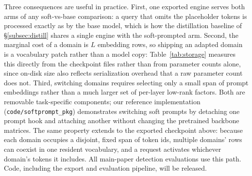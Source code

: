 \documentclass{article}
\begin{document}
Three consequences are useful in practice.
First, one exported engine serves both arms of any soft-vs-base comparison: a query that omits the placeholder tokens is processed exactly as by the base model, which is how the distillation baseline of \S\ref{subsec:distill} shares a single engine with the soft-prompted arm.
Second, the marginal cost of a domain is $L$ embedding rows, so shipping an adapted domain is a vocabulary patch rather than a model copy: Table~\ref{tab:storage} measures this directly from the checkpoint files rather than from parameter counts alone, since on-disk size also reflects serialization overhead that a raw parameter count does not.
Third, switching domains requires selecting only a small span of prompt
embeddings rather than a much larger set of per-layer low-rank factors.
Both are removable task-specific components; our reference implementation
(\texttt{code/softprompt\_pkg}) demonstrates switching soft prompts by
detaching one prompt hook and attaching another without changing the
pretrained backbone matrices.
The same property extends to the exported checkpoint above: because each domain occupies a disjoint, fixed span of token ids, multiple domains' rows can coexist in one resident vocabulary, and a request activates whichever domain's tokens it includes.
All main-paper detection evaluations use this path.
Code, including the export and evaluation pipeline, will be released.
\end{document}
